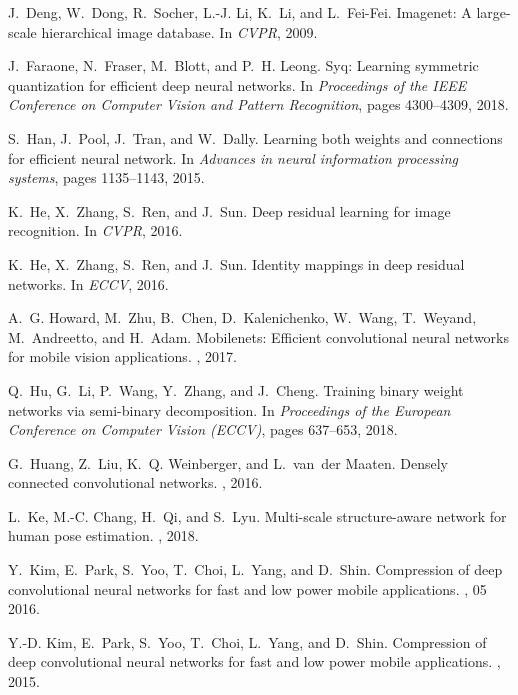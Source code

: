 \documentclass[10pt,twocolumn,letterpaper]{article}
\begin{document}
{\begin{thebibliography}{10}
J.~Deng, W.~Dong, R.~Socher, L.-J. Li, K.~Li, and L.~Fei-Fei.
\newblock Imagenet: A large-scale hierarchical image database.
\newblock In {\em CVPR}, 2009.

J.~Faraone, N.~Fraser, M.~Blott, and P.~H. Leong.
\newblock Syq: Learning symmetric quantization for efficient deep neural
  networks.
\newblock In {\em Proceedings of the IEEE Conference on Computer Vision and
  Pattern Recognition}, pages 4300--4309, 2018.

S.~Han, J.~Pool, J.~Tran, and W.~Dally.
\newblock Learning both weights and connections for efficient neural network.
\newblock In {\em Advances in neural information processing systems}, pages
  1135--1143, 2015.

K.~He, X.~Zhang, S.~Ren, and J.~Sun.
\newblock Deep residual learning for image recognition.
\newblock In {\em CVPR}, 2016.

K.~He, X.~Zhang, S.~Ren, and J.~Sun.
\newblock Identity mappings in deep residual networks.
\newblock In {\em ECCV}, 2016.

A.~G. Howard, M.~Zhu, B.~Chen, D.~Kalenichenko, W.~Wang, T.~Weyand,
  M.~Andreetto, and H.~Adam.
\newblock Mobilenets: Efficient convolutional neural networks for mobile vision
  applications.
, 2017.

Q.~Hu, G.~Li, P.~Wang, Y.~Zhang, and J.~Cheng.
\newblock Training binary weight networks via semi-binary decomposition.
\newblock In {\em Proceedings of the European Conference on Computer Vision
  (ECCV)}, pages 637--653, 2018.

G.~Huang, Z.~Liu, K.~Q. Weinberger, and L.~van~der Maaten.
\newblock Densely connected convolutional networks.
, 2016.

L.~Ke, M.-C. Chang, H.~Qi, and S.~Lyu.
\newblock Multi-scale structure-aware network for human pose estimation.
, 2018.

Y.~Kim, E.~Park, S.~Yoo, T.~Choi, L.~Yang, and D.~Shin.
\newblock Compression of deep convolutional neural networks for fast and low
  power mobile applications.
, 05 2016.

Y.-D. Kim, E.~Park, S.~Yoo, T.~Choi, L.~Yang, and D.~Shin.
\newblock Compression of deep convolutional neural networks for fast and low
  power mobile applications.
, 2015.


\end{thebibliography}}
\end{document}
